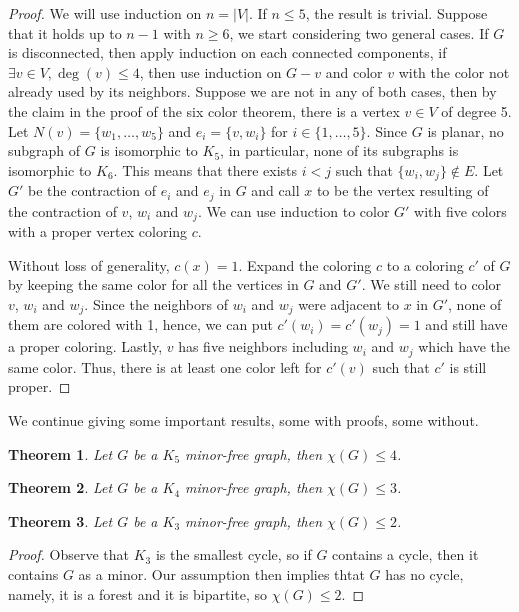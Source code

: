 \documentclass{tufte-handout}
\newtheorem{thm}{Theorem}
\theoremstyle{definition}
\theoremstyle{remark}
\begin{document}
\begin{proof}
	We will use induction on $n = |V|$. If $n \leq 5$, the result is trivial. Suppose that it holds up to $n-1$ with $n \geq 6$, we start considering two general cases. If $G$ is disconnected, then apply induction on each connected components, if $\exists v \in V, \deg(v) \leq 4$, then use induction on $G-v$ and color $v$ with the color not already used by its neighbors. Suppose we are not in any of both cases, then by the claim in the proof of the six color theorem, there is a vertex $v \in V$ of degree 5. Let $N(v) = \{w_1, \dots, w_5\}$ and $e_i = \{v, w_i\}$ for $i \in \{1,\dots, 5\}$. Since $G$ is planar, no subgraph of $G$ is isomorphic to $K_5$, in particular, none of its subgraphs is isomorphic to $K_6$. This means that there exists $i < j$ such that $\{w_i, w_j\} \notin E$. Let $G'$ be the contraction of $e_i$ and $e_j$ in $G$ and call $x$ to be the vertex resulting of the contraction of $v$, $w_i$ and $w_j$. We can use induction to color $G'$ with five colors with a proper vertex coloring $c$.
	
	Without loss of generality, $c(x) = 1$. Expand the coloring $c$ to a coloring $c'$ of $G$ by keeping the same color for all the vertices in $G$ and $G'$. We still need to color $v$, $w_i$ and $w_j$. Since the neighbors of $w_i$ and $w_j$ were adjacent to $x$ in $G'$, none of them are colored with 1, hence, we can put $c'(w_i) = c'(w_j) = 1$ and still have a proper coloring. Lastly, $v$ has five neighbors including $w_i$ and $w_j$ which have the same color. Thus, there is at least one color left for $c'(v)$ such that $c'$ is still proper.
\end{proof}
We continue giving some important results, some with proofs, some without.
\begin{thm}
	Let $G$ be a $K_5$ minor-free graph, then $\chi(G) \leq 4$.
\end{thm}
\begin{thm}
	Let $G$ be a $K_4$ minor-free graph, then $\chi(G) \leq 3$.
\end{thm}
\begin{thm}
	Let $G$ be a $K_3$ minor-free graph, then $\chi(G) \leq 2$.
\end{thm}
\begin{proof}
	Observe that $K_3$ is the smallest cycle, so if $G$ contains a cycle, then it contains $G$ as a minor. Our assumption then implies thtat $G$ has no cycle, namely, it is a forest and it is bipartite, so $\chi(G) \leq 2$.
\end{proof}
\end{document}
